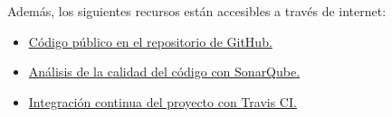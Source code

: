 Además, los siguientes recursos están accesibles a través de internet:

\begin{itemize}
	\tightlist
	\item
	\href{https://github.com/trona85/GII-17.1B-UBULog-1.0}{Código público en el repositorio de GitHub.}
	\item
	\href{https://sonarcloud.io/dashboard?id=GII-17.1B-UBULog-1.0}{Análisis de la calidad del código con SonarQube.}
	\item
	\href{https://travis-ci.org/trona85/GII-17.1B-UBULog-1.0/}{Integración continua del proyecto con Travis CI.}
	
\end{itemize}



